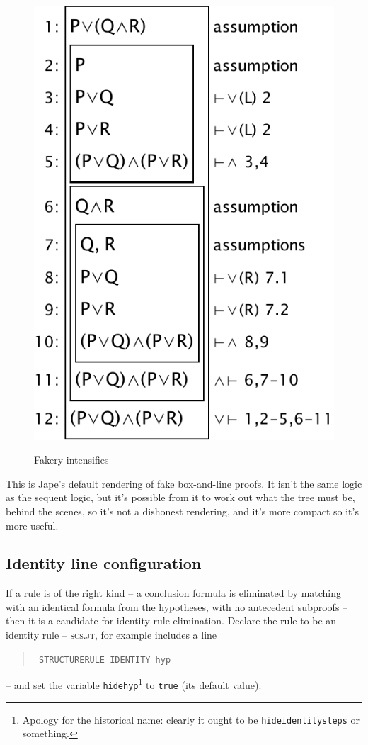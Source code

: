 \documentclass[11pt]{article}
\renewcommand{\picscale}{0.6}
\newenvironment{japeish}{\begin{quote}\tt\small}{\end{quote}}
\newcommand{\textj}[1]{{\tt\small{#1}}}
\begin{document}
\begin{figure}
{\includegraphics[scale=\picscale]{pics/secondtreeboxedidhidden}
\label{fig:secondtreeboxedidhidden}}
\caption{Fakery intensifies}
\label{fig:secondtreeboxedall}
\end{figure}

This is Jape's default rendering of fake box-and-line proofs. It isn't the same logic as the sequent logic, but it's possible from it to work out what the tree must be, behind the scenes, so it's not a dishonest rendering, and it's more compact so it's more useful.

\subsection{Identity line configuration}

If a rule is of the right kind -- a conclusion formula is eliminated by matching with an identical formula from the hypotheses, with no antecedent subproofs -- then it is a candidate for identity rule elimination. Declare the rule to be an identity rule -- \textsc{scs.jt}, for example includes a line
\begin{japeish}
STRUCTURERULE IDENTITY hyp
\end{japeish}
-- and set the variable \textj{hidehyp}\footnote{Apology for the historical name: clearly it ought to be \textj{hideidentitysteps} or something.} to \textj{true} (its default value).
\end{document}
